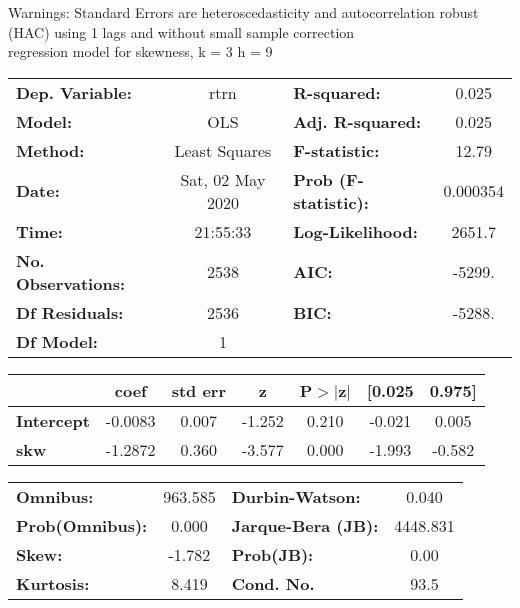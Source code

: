 Warnings: \newline
 [1] Standard Errors are heteroscedasticity and autocorrelation robust (HAC) using 1 lags and without small sample correction\\ 

regression model for skewness, k = 3 h = 9\begin{center}
\begin{tabular}{lclc}
\toprule
\textbf{Dep. Variable:}    &       rtrn       & \textbf{  R-squared:         } &     0.025   \\
\textbf{Model:}            &       OLS        & \textbf{  Adj. R-squared:    } &     0.025   \\
\textbf{Method:}           &  Least Squares   & \textbf{  F-statistic:       } &     12.79   \\
\textbf{Date:}             & Sat, 02 May 2020 & \textbf{  Prob (F-statistic):} &  0.000354   \\
\textbf{Time:}             &     21:55:33     & \textbf{  Log-Likelihood:    } &    2651.7   \\
\textbf{No. Observations:} &        2538      & \textbf{  AIC:               } &    -5299.   \\
\textbf{Df Residuals:}     &        2536      & \textbf{  BIC:               } &    -5288.   \\
\textbf{Df Model:}         &           1      & \textbf{                     } &             \\
\bottomrule
\end{tabular}
\begin{tabular}{lcccccc}
                   & \textbf{coef} & \textbf{std err} & \textbf{z} & \textbf{P$> |$z$|$} & \textbf{[0.025} & \textbf{0.975]}  \\
\midrule
\textbf{Intercept} &      -0.0083  &        0.007     &    -1.252  &         0.210        &       -0.021    &        0.005     \\
\textbf{skw}       &      -1.2872  &        0.360     &    -3.577  &         0.000        &       -1.993    &       -0.582     \\
\bottomrule
\end{tabular}
\begin{tabular}{lclc}
\textbf{Omnibus:}       & 963.585 & \textbf{  Durbin-Watson:     } &    0.040  \\
\textbf{Prob(Omnibus):} &   0.000 & \textbf{  Jarque-Bera (JB):  } & 4448.831  \\
\textbf{Skew:}          &  -1.782 & \textbf{  Prob(JB):          } &     0.00  \\
\textbf{Kurtosis:}      &   8.419 & \textbf{  Cond. No.          } &     93.5  \\
\bottomrule
\end{tabular}
\end{center}

